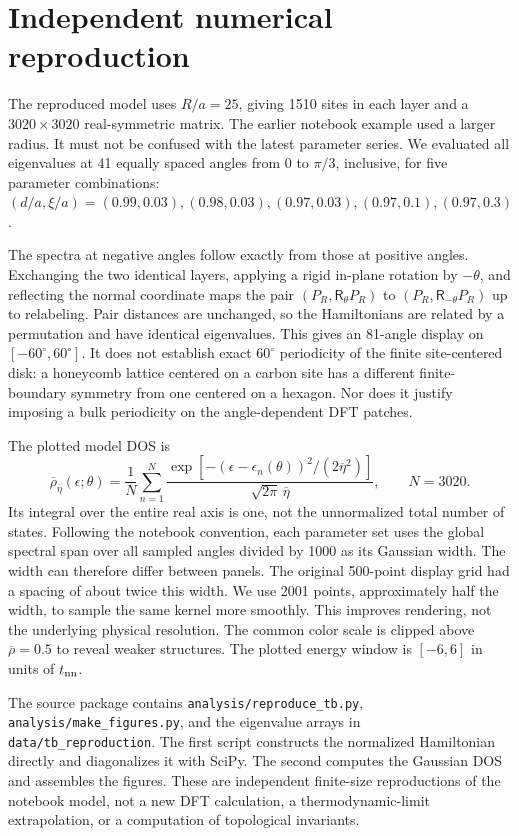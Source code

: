\documentclass[aps,prl,10pt,onecolumn,superscriptaddress,longbibliography]{revtex4-2}
\begin{document}
\section{Independent numerical reproduction}

The reproduced model uses $R/a=25$, giving 1510 sites in each layer and a $3020\times3020$ real-symmetric matrix. The earlier notebook example used a larger radius. It must not be confused with the latest parameter series. We evaluated all eigenvalues at 41 equally spaced angles from $0$ to $\pi/3$, inclusive, for five parameter combinations: $(d/a,\xi/a)=(0.99,0.03),(0.98,0.03),(0.97,0.03),(0.97,0.1),(0.97,0.3)$.

The spectra at negative angles follow exactly from those at positive angles. Exchanging the two identical layers, applying a rigid in-plane rotation by $-\theta$, and reflecting the normal coordinate maps the pair $(P_R,\mathsf R_\theta P_R)$ to $(P_R,\mathsf R_{-\theta}P_R)$ up to relabeling. Pair distances are unchanged, so the Hamiltonians are related by a permutation and have identical eigenvalues. This gives an 81-angle display on $[-60^\circ,60^\circ]$. It does not establish exact $60^\circ$ periodicity of the finite site-centered disk: a honeycomb lattice centered on a carbon site has a different finite-boundary symmetry from one centered on a hexagon. Nor does it justify imposing a bulk periodicity on the angle-dependent DFT patches.

The plotted model DOS is
\begin{equation}
 \overline\rho_{\overline\eta}(\epsilon;\theta)
 =\frac{1}{N}\sum_{n=1}^N
 \frac{\exp[-(\epsilon-\epsilon_n(\theta))^2/(2\overline\eta^2)]}
 {\sqrt{2\pi}\,\overline\eta},\qquad N=3020.
\end{equation}
Its integral over the entire real axis is one, not the unnormalized total number of states. Following the notebook convention, each parameter set uses the global spectral span over all sampled angles divided by 1000 as its Gaussian width. The width can therefore differ between panels. The original 500-point display grid had a spacing of about twice this width. We use 2001 points, approximately half the width, to sample the same kernel more smoothly. This improves rendering, not the underlying physical resolution. The common color scale is clipped above $\overline\rho=0.5$ to reveal weaker structures. The plotted energy window is $[-6,6]$ in units of $t_{\rm nn}$.

The source package contains \texttt{analysis/reproduce\_tb.py}, \texttt{analysis/make\_figures.py}, and the eigenvalue arrays in \texttt{data/tb\_reproduction}. The first script constructs the normalized Hamiltonian directly and diagonalizes it with SciPy. The second computes the Gaussian DOS and assembles the figures. These are independent finite-size reproductions of the notebook model, not a new DFT calculation, a thermodynamic-limit extrapolation, or a computation of topological invariants.
\end{document}
